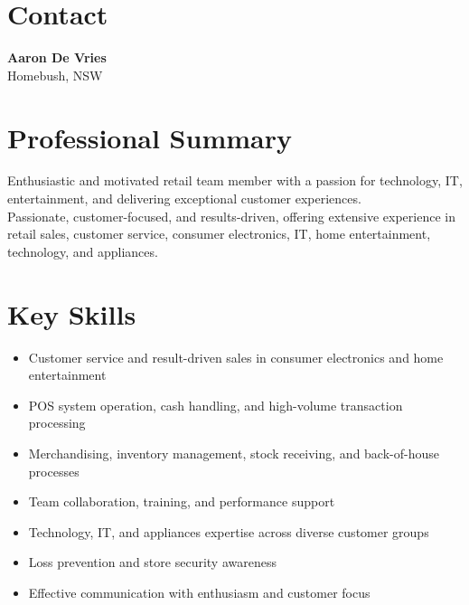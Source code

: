 \documentclass[a4paper,10pt]{article}
\begin{document}
\ContactBlock

\section*{Contact}
\textbf{Aaron De Vries} \\
Homebush, NSW \\
\section*{Professional Summary}
Enthusiastic and motivated retail team member with a passion for technology, IT, entertainment, and delivering exceptional customer experiences.\\
Passionate, customer-focused, and results-driven, offering extensive experience in retail sales, customer service, consumer electronics, IT, home entertainment, technology, and appliances.
\section*{Key Skills}
\begin{itemize}
\item Customer service and result-driven sales in consumer electronics and home entertainment
\item POS system operation, cash handling, and high-volume transaction processing
\item Merchandising, inventory management, stock receiving, and back-of-house processes
\item Team collaboration, training, and performance support
\item Technology, IT, and appliances expertise across diverse customer groups
\item Loss prevention and store security awareness
\item Effective communication with enthusiasm and customer focus
\end{itemize}
\end{document}
